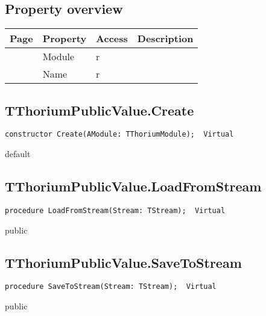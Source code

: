 \subsection{Property overview}
\label{thoriumcore:thorium:tthoriumpublicvalue:properties}
\begin{tabularx}{\textwidth}{lllX}
Page & Property & Access & Description \\ \hline
\pageref{thoriumcore:thorium:tthoriumpublicvalue:module} & Module & r &  \\
\pageref{thoriumcore:thorium:tthoriumpublicvalue:name} & Name & r &  \\
\hline
\end{tabularx}
\subsection{TThoriumPublicValue.Create}
\label{thoriumcore:thorium:tthoriumpublicvalue:create}
\begin{FPCList}
\Synopsis
\Declaration 

\begin{verbatim}
constructor Create(AModule: TThoriumModule);  Virtual
\end{verbatim}
\Visibility
default
\Description
\Errors
\end{FPCList}
\subsection{TThoriumPublicValue.LoadFromStream}
\label{thoriumcore:thorium:tthoriumpublicvalue:loadfromstream}
\begin{FPCList}
\Synopsis
\Declaration 

\begin{verbatim}
procedure LoadFromStream(Stream: TStream);  Virtual
\end{verbatim}
\Visibility
public
\Description
\Errors
\end{FPCList}
\subsection{TThoriumPublicValue.SaveToStream}
\label{thoriumcore:thorium:tthoriumpublicvalue:savetostream}
\begin{FPCList}
\Synopsis
\Declaration 

\begin{verbatim}
procedure SaveToStream(Stream: TStream);  Virtual
\end{verbatim}
\Visibility
public
\Description
\Errors
\end{FPCList}
